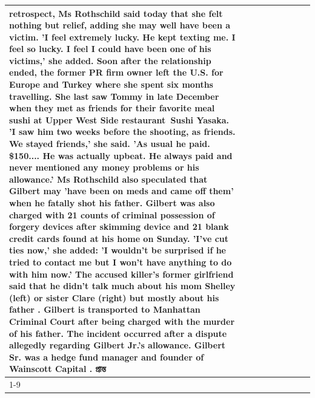 \begin{table}[H]
\begin{tabular}{lllrlllll}
retrospect, Ms Rothschild said today that she felt nothing but relief, adding she may well have been a victim. 'I feel extremely lucky. He kept texting me. I feel so lucky. I feel I could have been one of his victims,' she added. Soon after the relationship ended, the former PR firm owner left the U.S. for Europe and Turkey where she spent six months  travelling. She last saw Tommy in late December when they met as friends for their favorite meal sushi at Upper West Side restaurant Sushi Yasaka. 'I saw him two weeks before the shooting, as friends. We stayed friends,' she said. 'As usual he paid. \$150.... He was actually upbeat. He always paid and never mentioned any money problems or his allowance.' Ms Rothschild also speculated that Gilbert may 'have been on meds and came off them' when he fatally shot his father. Gilbert was also charged with 21 counts of criminal possession of forgery devices after skimming device and 21 blank credit cards found at his home on Sunday. 'I've cut ties now,' she added: 'I wouldn’t be surprised if he tried to contact me but I won’t have anything to do with him now.' The accused killer's former girlfriend said that he didn't talk much about his mom Shelley (left) or sister Clare (right) but mostly about his father . Gilbert is transported to Manhattan Criminal Court  after being charged with the murder of his father. The incident occurred after a dispute allegedly regarding Gilbert Jr.'s allowance. Gilbert Sr. was a hedge fund manager and founder of Wainscott Capital . প্রান্ত \\
\cline{1-9}

\end{tabular}
\end{table}
